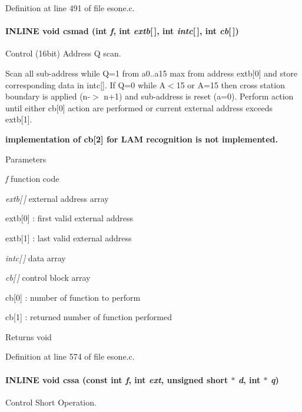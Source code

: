Definition at line 491 of file esone.c.
\paragraph[{csmad}]{\setlength{\rightskip}{0pt plus 5cm}INLINE void csmad (int {\em f}, \/  int {\em extb}\mbox{[}$\,$\mbox{]}, \/  int {\em intc}\mbox{[}$\,$\mbox{]}, \/  int {\em cb}\mbox{[}$\,$\mbox{]})}\hfill\label{esone_8c_a721f9a3b1bff9340d822e8f4e01a2ae2}
Control (16bit) Address Q scan.

Scan all sub-\/address while Q=1 from a0..a15 max from address extb\mbox{[}0\mbox{]} and store corresponding data in intc\mbox{[}\mbox{]}. If Q=0 while A$<$15 or A=15 then cross station boundary is applied (n-\/$>$ n+1) and sub-\/address is reset (a=0). Perform action until either cb\mbox{[}0\mbox{]} action are performed or current external address exceeds extb\mbox{[}1\mbox{]}.

{\bfseries implementation of cb\mbox{[}2\mbox{]} for LAM recognition is not implemented.}


\begin{DoxyParams}{Parameters}
\item[{\em f}]function code \item[{\em extb\mbox{[}$\,$\mbox{]}}]external address array\par
 extb\mbox{[}0\mbox{]} : first valid external address \par
 extb\mbox{[}1\mbox{]} : last valid external address \item[{\em intc\mbox{[}$\,$\mbox{]}}]data array \item[{\em cb\mbox{[}$\,$\mbox{]}}]control block array \par
 cb\mbox{[}0\mbox{]} : number of function to perform \par
 cb\mbox{[}1\mbox{]} : returned number of function performed \end{DoxyParams}
\begin{DoxyReturn}{Returns}
void 
\end{DoxyReturn}


Definition at line 574 of file esone.c.
\paragraph[{cssa}]{\setlength{\rightskip}{0pt plus 5cm}INLINE void cssa (const int {\em f}, \/  int {\em ext}, \/  unsigned short $\ast$ {\em d}, \/  int $\ast$ {\em q})}\hfill\label{esone_8c_a3cac38ee8219ab19a63dd43dbd4c525d}
Control Short Operation.

